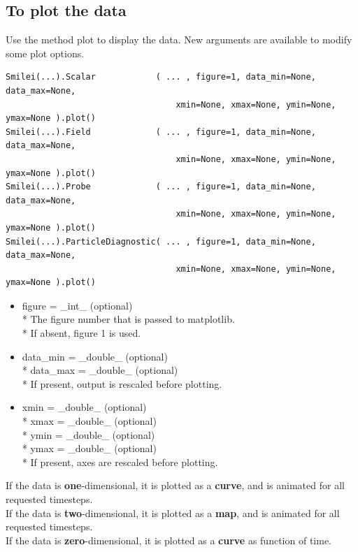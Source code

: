 \documentclass[11pt]{article}
\newcommand{\code}[1]{\colorbox{yellow!15}{\ttfamily #1}}
\begin{document}
\subsection{To plot the data}
Use the method \code{plot} to display the data. New arguments are available to modify some plot options.
\begin{lstlisting}
Smilei(...).Scalar            ( ... , figure=1, data_min=None, data_max=None,
                                  xmin=None, xmax=None, ymin=None, ymax=None ).plot()
Smilei(...).Field             ( ... , figure=1, data_min=None, data_max=None,
                                  xmin=None, xmax=None, ymin=None, ymax=None ).plot()
Smilei(...).Probe             ( ... , figure=1, data_min=None, data_max=None,
                                  xmin=None, xmax=None, ymin=None, ymax=None ).plot()
Smilei(...).ParticleDiagnostic( ... , figure=1, data_min=None, data_max=None,
                                  xmin=None, xmax=None, ymin=None, ymax=None ).plot()
\end{lstlisting}

\begin{itemize}
\item \code{figure} = \code{\_int\_}       (optional)\\*
	The figure number that is passed to matplotlib.\\*
	If absent, figure 1 is used.

\item \code{data\_min} = \code{\_double\_}    (optional)\\*
	\code{data\_max} = \code{\_double\_}    (optional)\\*
	If present, output is rescaled before plotting.

\item \code{xmin} = \code{\_double\_}    (optional)\\*
	\code{xmax} = \code{\_double\_}    (optional)\\*
	\code{ymin} = \code{\_double\_}    (optional)\\*
	\code{ymax} = \code{\_double\_}    (optional)\\*
	If present, axes are rescaled before plotting.
\end{itemize}

If the data is \textbf{one}-dimensional, it is plotted as a \textbf{curve}, and is animated for all requested timesteps.\\
If the data is \textbf{two}-dimensional, it is plotted as a \textbf{map}, and is animated for all requested timesteps.\\
If the data is \textbf{zero}-dimensional, it is plotted as a \textbf{curve} as function of time.\\
\end{document}
